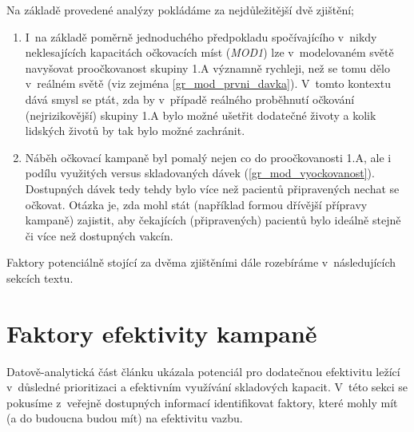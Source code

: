 Na základě provedené analýzy pokládáme za nejdůležitější dvě zjištění;
\begin{enumerate}
\item I~na základě poměrně jednoduchého předpokladu spočívajícího v~nikdy neklesajících kapacitách očkovacích míst (\emph{MOD1}) lze v~modelovaném světě navyšovat proočkovanost skupiny 1.A významně rychleji, než se tomu dělo v~reálném světě (viz zejména  \ref{gr_mod_prvni_davka}). V~tomto kontextu dává smysl se ptát, zda by v~případě reálného proběhnutí očkování (nejrizikovější) skupiny 1.A bylo možné ušetřit dodatečné životy a kolik lidských životů by tak bylo možné zachránit.
\item Náběh očkovací kampaně byl pomalý nejen co do proočkovanosti 1.A, ale i podílu využitých versus skladovaných dávek (\ref{gr_mod_vyockovanost}). Dostupných dávek tedy tehdy bylo více než pacientů připravených nechat se očkovat. Otázka je, zda mohl stát (například formou dřívější přípravy kampaně) zajistit, aby čekajících (připravených) pacientů bylo ideálně stejně či více než dostupných vakcín.
\end{enumerate}
Faktory potenciálně stojící za dvěma zjištěními dále rozebíráme v~následujících sekcích textu.






\section*{Faktory efektivity kampaně}
\label{sec:shrnuti}


Datově-analytická část článku ukázala potenciál pro dodatečnou efektivitu ležící v~důsledné prioritizaci a efektivním využívání skladových kapacit. V~této sekci se pokusíme z~veřejně dostupných informací identifikovat faktory, které mohly mít (a do budoucna budou mít) na efektivitu vazbu. %


